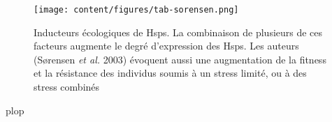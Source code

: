 \documentclass[%
	a4paper,
	11pt,
	linktocpage=true,
	oneside,
	DIV=calc, 
	]{scrreprt}
\begin{document}
\begin{figure}[!h]
\centering
\texttt{[image: content/figures/tab-sorensen.png]}
\caption{Inducteurs écologiques de Hsps. La combinaison de plusieurs de ces facteurs augmente le degré d'expression des Hsps. Les auteurs (Sørensen \textit{et al.} 2003) évoquent aussi une augmentation de la fitness et la résistance des individus soumis à un stress limité, ou à des stress combinés}
\label{tabsørensen}
\end{figure}

\newpage
plop
\end{document}
